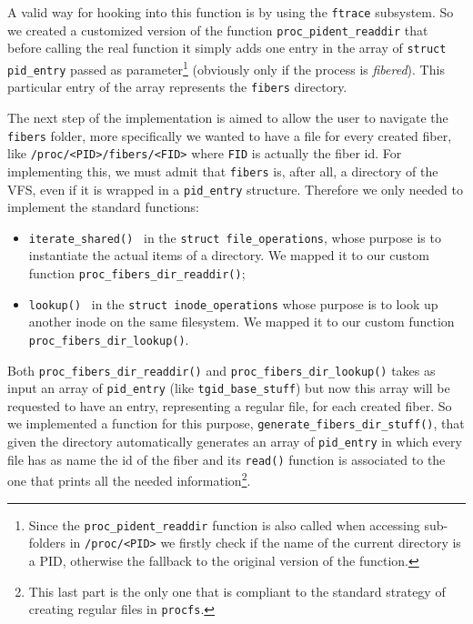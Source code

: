 \documentclass[a4paper,10pt]{article}
\begin{document}
  A valid way for hooking into this function is by using the \lstinline{ftrace} subsystem. So we created a customized version of the function \lstinline{proc_pident_readdir} that before calling the real function it simply adds one entry in the array of \lstinline{struct pid_entry} passed as parameter\footnote{Since the \lstinline{proc_pident_readdir} function is also called when accessing sub-folders in \lstinline{/proc/<PID>} we firstly check if the name of the current directory is a PID, otherwise the fallback to the original version of the function.} (obviously only if the process is \textit{fibered}). This particular entry of the array represents the \texttt{fibers} directory.

  The next step of the implementation is aimed to allow the user to navigate the \texttt{fibers} folder, more specifically we wanted to have a file for every created fiber, like \lstinline{/proc/<PID>/fibers/<FID>} where \texttt{FID} is actually the fiber id. For implementing this, we must admit that \texttt{fibers} is, after all, a directory of the VFS, even if it is wrapped in a \lstinline{pid_entry} structure. Therefore we only needed to implement the standard functions:
  \begin{itemize}
    \item \lstinline{iterate_shared()}~\cite{kern_file_ops_iterate} in the \lstinline{struct file_operations}, whose purpose is to instantiate the actual items of a directory. We mapped it to our custom function \lstinline{proc_fibers_dir_readdir()};
    \item \lstinline{lookup()}~\cite{kern_inode_ops_lookup} in the \lstinline{struct inode_operations} whose purpose is to look up another inode on the same filesystem. We mapped it to our custom function \lstinline{proc_fibers_dir_lookup()}.
  \end{itemize}
  Both \lstinline{proc_fibers_dir_readdir()} and \lstinline{proc_fibers_dir_lookup()} takes as input an array of \lstinline{pid_entry} (like \lstinline{tgid_base_stuff}) but now this array will be requested to have an entry, representing a regular file, for each created fiber. So we implemented a function for this purpose, \lstinline{generate_fibers_dir_stuff()}, that given the directory automatically generates an array of \lstinline{pid_entry} in which every file has as name the id of the fiber and its \lstinline{read()} function is associated to the one that prints all the needed information\footnote{This last part is the only one that is compliant to the standard strategy of creating regular files in \texttt{procfs}.}.
\end{document}
